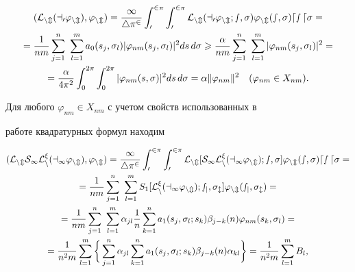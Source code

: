 \begin{multline}


(\rL_{nm}(a_0\vp_{nm}),\vp_{nm}) = \frac{1}{4\pi^2}\int_0^{2\pi}\int_0^{2\pi}


\rL_{nm}(a_0\vp_{nm};s,\si)\varphi_{nm}(s,\sigma)ds\, d\si = \\


%


=\frac{1}{nm}\sum_{j=1}^n\ \sum_{l=1}^m a_0(s_j,\si_l)


|\vp_{nm}(s_j,\si_l)|^2ds\, d\si \gea


\frac{\alpha}{nm}\sum_{j=1}^n\ \sum_{l=1}^m|\vp_{nm}(s_j,\si_l)|^2 = \\


%


=\frac{\alpha}{4\pi^2}\int_0^{2\pi}\int_0^{2\pi}|\vp_{nm}(s,\sigma)|^2ds\,d\si = 


\alpha \|\vp_{nm}\|^2\quad (\vp_{nm}\in X_{nm}).


\end{multline}


Для любого $\varphi_{nm}\in X_{nm}$ с учетом свойств использованных в 


работе квадратурных формул находим


\begin{gather*}


(\rL_{nm}S_1\rL_n^\xi (a_1\vp_{nm}),\vp_{nm}) = 


\frac{1}{4\pi^2}\int_0^{2\pi}\int_0^{2\pi}


\rL_{nm}[S_1\rL_n^\xi(a_1\vp_{nm});s,\si]\vp_{nm}(s,\si)ds\, d\si = \\


%


=\frac{1}{nm}\sum_{j=1}^n\ \sum_{l=1}^mS_1[\rL_n^\xi(a_1\vp_{nm});s_j,\si_l]


\vp_{nm}(s_j,\si_l) = \\


%


=\frac{1}{nm}\sum_{j=1}^n\ \sum_{l=1}^m \alpha_{jl}\frac{1}{n}


\sum_{k=1}^n a_1(s_j,\si_l;s_k)\beta_{j-k}(n)\vp_{nm}(s_k,\si_l) = \\


%


=\frac{1}{n^2m}\sum_{l=1}^m\bigg\{


\sum_{j=1}^n\alpha_{jl}\sum_{k=1}^na_1(s_j,\si_l;s_k)\beta_{j-k}(n)\alpha_{kl}


\bigg\} = \frac{1}{n^2m}\sum_{l=1}^m B_l,


\end{gather*}


